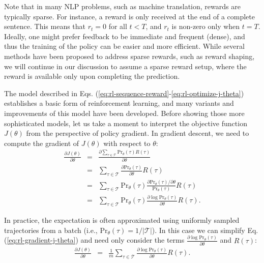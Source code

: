 Note that in many NLP problems, such as machine translation, rewards are typically sparse. For instance, a reward is only received at the end of a complete sentence. This means that $r_t = 0$ for all $t < T$, and $r_t$ is non-zero only when $t = T$. Ideally, one might prefer feedback to be immediate and frequent (dense), and thus the training of the policy can be easier and more efficient. While several methods have been proposed to address sparse rewards, such as reward shaping, we will continue in our discussion to assume a sparse reward setup, where the reward is available only upon completing the prediction.

The model described in Eqs. (\ref{eq:rl-sequence-reward}-\ref{eq:rl-optimize-j-theta}) establishes a basic form of reinforcement learning, and many variants and improvements of this model have been developed. Before showing those more sophisticated models, let us take a moment to interpret the objective function $J(\theta)$ from the perspective of policy gradient. In gradient descent, we need to compute the gradient of $J(\theta)$ with respect to $\theta$:
\begin{eqnarray}
\frac{\partial J(\theta)}{\partial \theta} & = & \frac{\partial  \sum_{\tau \in \mathcal{T}} \mathrm{Pr}_{\theta}(\tau) R(\tau)}{\partial \theta} \nonumber \\
& = & \sum_{\tau \in \mathcal{T}} \frac{\partial  \mathrm{Pr}_{\theta}(\tau) }{\partial \theta}  R(\tau) \nonumber \\
& = & \sum_{\tau \in \mathcal{T}} \mathrm{Pr}_{\theta}(\tau) \frac{\partial  \mathrm{Pr}_{\theta}(\tau)/\partial \theta}{\mathrm{Pr}_{\theta}(\tau) } R(\tau) \nonumber \\
& = & \sum_{\tau \in \mathcal{T}} \mathrm{Pr}_{\theta}(\tau) \frac{\partial  \log \mathrm{Pr}_{\theta}(\tau) }{\partial \theta} R(\tau). \label{eq:rl-gradient-j-theta}
\end{eqnarray}

In practice, the expectation is often approximated using uniformly sampled trajectories from a batch (i.e., $\mathrm{Pr}_{\theta}(\tau) = 1/|\mathcal{T}|$).  In this case we can simplify Eq. (\ref{eq:rl-gradient-j-theta}) and need only consider the terms $\frac{\partial \log \mathrm{Pr}_{\theta}(\tau)}{\partial \theta}$ and $R(\tau)$:
\begin{eqnarray}
\frac{\partial J(\theta)}{\partial \theta} & = & \frac{1}{m} \sum_{\tau \in \mathcal{T}} \frac{\partial  \log \mathrm{Pr}_{\theta}(\tau)}{\partial \theta} R(\tau). \label{eq:rl-j-theta-gradient-simplified}
\end{eqnarray}

